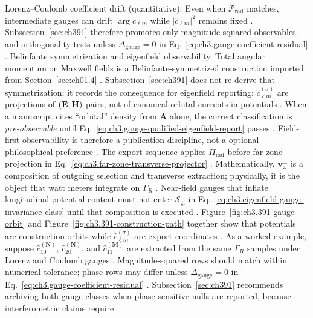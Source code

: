 Lorenz--Coulomb coefficient drift (quantitative). Even when \(\mathcal{P}_{\mathrm{rad}}\) matches, intermediate gauges can drift \(\arg\widehat{c}_{\ell m}\) while \(|\widehat{c}_{\ell m}|^{2}\) remains fixed \cite{belinfante1940}. Subsection~\ref{sec:ch391} therefore promotes only magnitude-squared observables and orthogonality tests unless \(\Delta_{\mathrm{gauge}}=0\) in Eq.~\eqref{eq:ch3.gauge-coefficient-residual} \cite{harrington2001}.
Belinfante symmetrization and eigenfield observability. Total angular momentum on Maxwell fields is a Belinfante-symmetrized construction imported from Section~\ref{sec:ch01.4} \cite{belinfante1940}.
Subsection~\ref{sec:ch391} does not re-derive that symmetrization; it records the consequence for eigenfield reporting: \(\widehat{c}_{\ell m}^{(\sigma)}\)
are projections of \((\mathbf{E},\mathbf{H})\) pairs, not of canonical orbital currents in potentials \cite{hansen1988}. When a manuscript cites
``orbital'' density from \(\mathbf{A}\) alone, the correct classification is \emph{pre-observable} until Eq.~\eqref{eq:ch3.gauge-qualified-eigenfield-report}
passes \cite{belinfante1940}. Field-first observability is therefore a publication discipline, not a optional philosophical preference
\cite{harrington2001}.
The export sequence applies \(\Pi_{\mathrm{rad}}\) before far-zone projection in Eq.~\eqref{eq:ch3.far-zone-transverse-projector}
\cite{harrington2001}. Mathematically, \(\mathbf{v}_\omega^{\perp}\) is a composition of outgoing selection and transverse extraction;
physically, it is the object that watt meters integrate on \(\Gamma_R\) \cite{poynting1884}. Near-field gauges that inflate longitudinal
potential content must not enter \(\mathcal{S}_{\mathrm{gi}}\) in Eq.~\eqref{eq:ch3.eigenfield-gauge-invariance-class} until that composition is executed
\cite{belinfante1940}. Figure~\ref{fig:ch3.391-gauge-orbit} and Figure~\ref{fig:ch3.391-construction-path} together show that
potentials are construction orbits while \(\widehat{c}_{\ell m}^{(\sigma)}\) are export coordinates \cite{tai1994}.
As a worked example, suppose \(\widehat{c}_{10}^{(\mathbf{N})}\), \(\widehat{c}_{20}^{(\mathbf{N})}\), and \(\widehat{c}_{11}^{(\mathbf{M})}\) are extracted from the same
\(\Gamma_R\) samples under Lorenz and Coulomb gauges \cite{stratton1941}. Magnitude-squared rows should match within numerical tolerance;
phase rows may differ unless \(\Delta_{\mathrm{gauge}}=0\) in Eq.~\eqref{eq:ch3.gauge-coefficient-residual} \cite{belinfante1940}.
Subsection~\ref{sec:ch391} recommends archiving both gauge classes when phase-sensitive nulls are reported, because interferometric claims require
